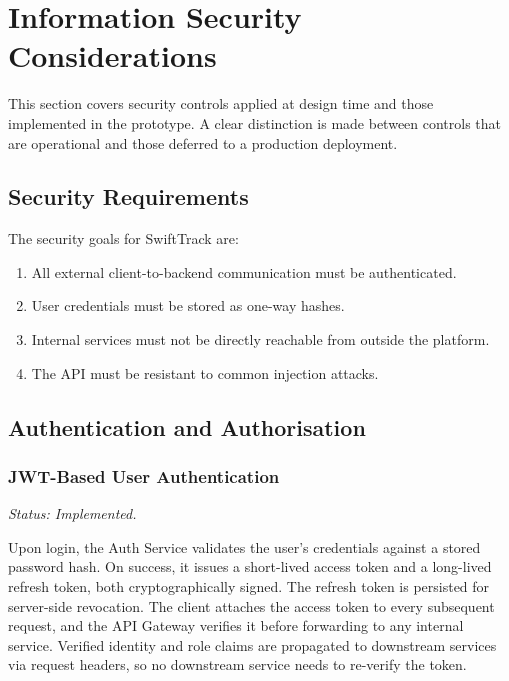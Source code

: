 \section{Information Security Considerations}
\label{sec:security}

This section covers security controls applied at design time and those implemented in the prototype. A clear distinction is made between controls that are operational and those deferred to a production deployment.

\subsection{Security Requirements}
\label{subsec:security_requirements}

The security goals for SwiftTrack are:
\begin{enumerate}
    \item All external client-to-backend communication must be authenticated.
    \item User credentials must be stored as one-way hashes.
    \item Internal services must not be directly reachable from outside the platform.
    \item The API must be resistant to common injection attacks.
\end{enumerate}

\subsection{Authentication and Authorisation}
\label{subsec:auth}

\subsubsection{JWT-Based User Authentication}

\textit{Status: Implemented.}

Upon login, the Auth Service validates the user's credentials against a stored password hash. On success, it issues a short-lived access token and a long-lived refresh token, both cryptographically signed. The refresh token is persisted for server-side revocation. The client attaches the access token to every subsequent request, and the API Gateway verifies it before forwarding to any internal service. Verified identity and role claims are propagated to downstream services via request headers, so no downstream service needs to re-verify the token.

